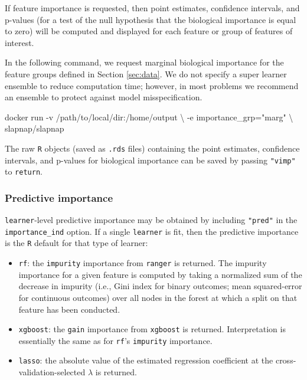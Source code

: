 \documentclass[]{article}
\newenvironment{Shaded}{\begin{snugshade}}{\end{snugshade}}
\newcommand{\StringTok}[1]{\textcolor[rgb]{0.31,0.60,0.02}{#1}}
\newcommand{\ExtensionTok}[1]{#1}
\newcommand{\NormalTok}[1]{#1}
\providecommand{\tightlist}{%
  \setlength{\itemsep}{0pt}\setlength{\parskip}{0pt}}
\begin{document}
If feature importance is requested, then point estimates, confidence
intervals, and p-values (for a test of the null hypothesis that the
biological importance is equal to zero) will be computed and displayed
for each feature or group of features of interest.

In the following command, we request marginal biological importance for
the feature groups defined in Section \ref{sec:data}. We do not specify
a super learner ensemble to reduce computation time; however, in most
problems we recommend an ensemble to protect against model
misspecification.

\begin{Shaded}
\begin{Highlighting}[]
\ExtensionTok{docker}\NormalTok{ run -v /path/to/local/dir:/home/output \textbackslash{}}
\NormalTok{           -e importance_grp=}\StringTok{"marg"}\NormalTok{ \textbackslash{}}
\NormalTok{           slapnap/slapnap}
\end{Highlighting}
\end{Shaded}

The raw \texttt{R} objects (saved as \texttt{.rds} files) containing the
point estimates, confidence intervals, and p-values for biological
importance can be saved by passing \texttt{"vimp"} to \texttt{return}.

\subsubsection{Predictive importance}\label{predictive-importance}

\texttt{learner}-level predictive importance may be obtained by
including \texttt{"pred"} in the \texttt{importance\_ind} option. If a
single \texttt{learner} is fit, then the predictive importance is the
\texttt{R} default for that type of learner:

\begin{itemize}
\tightlist
\item
  \texttt{rf}: the \texttt{impurity} importance from \texttt{ranger}
  \citep{rangerpkg} is returned. The impurity importance for a given
  feature is computed by taking a normalized sum of the decrease in
  impurity (i.e., Gini index for binary outcomes; mean squared-error for
  continuous outcomes) over all nodes in the forest at which a split on
  that feature has been conducted.
\item
  \texttt{xgboost}: the \texttt{gain} importance from \texttt{xgboost}
  \citep{xgboostpkg} is returned. Interpretation is essentially the same
  as for \texttt{rf}'s \texttt{impurity} importance.
\item
  \texttt{lasso}: the absolute value of the estimated regression
  coefficient at the cross-validation-selected \(\lambda\) is returned.
\end{itemize}
\end{document}
